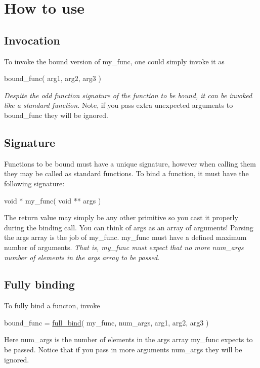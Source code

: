 \href{https://travis-ci.org/zwimer/C-bind}{\tt }

\section*{How to use}

\subsection*{Invocation}

To invoke the bound version of {\ttfamily my\+\_\+func}, one could simply invoke it as 
\begin{DoxyCode}
bound\_func( arg1, arg2, arg3 )
\end{DoxyCode}
 {\itshape Despite the odd function signature of the function to be bound, it can be invoked like a standard function.} Note, if you pass extra unexpected arguments to {\ttfamily bound\+\_\+func} they will be ignored.

\subsection*{Signature}

Functions to be bound must have a unique signature, however when calling them they may be called as standard functions. To bind a function, it must have the following signature\+: 
\begin{DoxyCode}
\textcolor{keywordtype}{void} * my\_func( \textcolor{keywordtype}{void} ** args )
\end{DoxyCode}
 The return value may simply be any other primitive so you cast it properly during the binding call. You can think of {\ttfamily args} as an array of arguments! Parsing the {\ttfamily args} array is the job of {\ttfamily my\+\_\+func}. {\ttfamily my\+\_\+func} must have a defined maximum number of \textquotesingle{}arguments\textquotesingle{}. {\itshape That is, {\ttfamily my\+\_\+func} must expect that no more {\ttfamily num\+\_\+args} number of elements in the {\ttfamily args} array to be passed.}

\subsection*{Fully binding}

To fully bind a functon, invoke 
\begin{DoxyCode}
bound\_func = \hyperlink{bind_8c_aba8492ffd71864427a5cddc0c3888454}{full\_bind}( my\_func, num\_args, arg1, arg2, arg3 )
\end{DoxyCode}
 Here {\ttfamily num\+\_\+args} is the number of elements in the {\ttfamily args} array {\ttfamily my\+\_\+func} expects to be passed. Notice that if you pass in more arguments {\ttfamily num\+\_\+args} they will be ignored.

